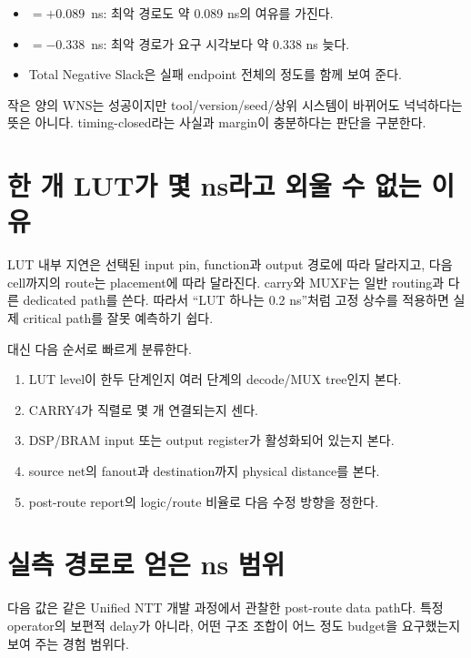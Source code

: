 \begin{itemize}
  \item \wns $=+0.089$~ns: 최악 경로도 약 0.089 ns의 여유를 가진다.
  \item \wns $=-0.338$~ns: 최악 경로가 요구 시각보다 약 0.338 ns 늦다.
  \item Total Negative Slack은 실패 endpoint 전체의 정도를 함께 보여 준다.
\end{itemize}

작은 양의 WNS는 성공이지만 tool/version/seed/상위 시스템이 바뀌어도 넉넉하다는
뜻은 아니다. timing-closed라는 사실과 margin이 충분하다는 판단을 구분한다.

\section{한 개 LUT가 몇 ns라고 외울 수 없는 이유}

LUT 내부 지연은 선택된 input pin, function과 output 경로에 따라 달라지고, 다음
cell까지의 route는 placement에 따라 달라진다. carry와 MUXF는 일반 routing과
다른 dedicated path를 쓴다. 따라서 ``LUT 하나는 0.2 ns''처럼 고정 상수를
적용하면 실제 critical path를 잘못 예측하기 쉽다.

대신 다음 순서로 빠르게 분류한다.

\begin{enumerate}
  \item LUT level이 한두 단계인지 여러 단계의 decode/MUX tree인지 본다.
  \item CARRY4가 직렬로 몇 개 연결되는지 센다.
  \item DSP/BRAM input 또는 output register가 활성화되어 있는지 본다.
  \item source net의 fanout과 destination까지 physical distance를 본다.
  \item post-route report의 logic/route 비율로 다음 수정 방향을 정한다.
\end{enumerate}

\section{실측 경로로 얻은 ns 범위}

다음 값은 같은 Unified NTT 개발 과정에서 관찰한 post-route data path다. 특정
operator의 보편적 delay가 아니라, 어떤 구조 조합이 어느 정도 budget을 요구했는지
보여 주는 경험 범위다.

